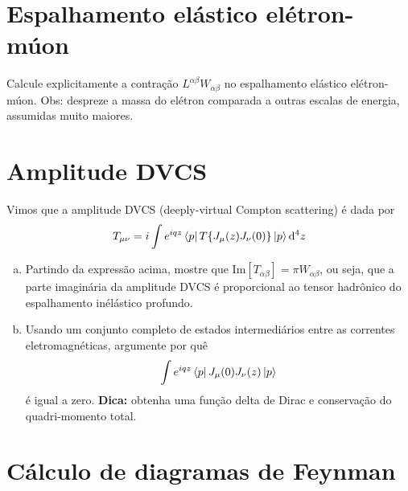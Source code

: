 \documentclass[a4paper, 11pt, oneside]{impression}
\begin{document}


\chapter{Espalhamento elástico elétron-múon}\label{quest: six}

\begin{exercise}{}
    Calcule explicitamente a contração $L^{\alpha\beta}W_{\alpha\beta}$ no espalhamento elástico elétron-múon. Obs: despreze a massa do elétron comparada a outras escalas de energia, assumidas muito maiores.
\end{exercise}



\chapter{Amplitude DVCS}\label{quest: seven}

\begin{exercise}{}
    Vimos que a amplitude DVCS (deeply-virtual Compton scattering) é dada por
        \begin{equation*}
            T_{\mu\nu} = i\int e^{iqz}\bra{p}T\{J_{\mu}(z)J_{\nu}(0)\}\ket{p}\dd[4]{z}
        \end{equation*}
    \begin{enumerate}[(a)]
        \item Partindo da expressão acima, mostre que $\text{Im}[T_{\alpha\beta}] = \pi W_{\alpha\beta}$, ou seja, que a parte imaginária da amplitude DVCS é proporcional ao tensor hadrônico do espalhamento inélástico profundo.
        \item Usando um conjunto completo de estados intermediários entre as correntes eletromagnéticas, argumente por quê
            \begin{equation*}
                \int e^{iqz} \bra{p}J_{\mu}(0)J_{\nu}(z)\ket{p}
            \end{equation*}
        é igual a zero. \textbf{Dica:} obtenha uma função delta de Dirac e conservação do quadri-momento total.
    \end{enumerate}
\end{exercise}



\chapter{Cálculo de diagramas de Feynman}\label{quest: eight}
\end{document}
